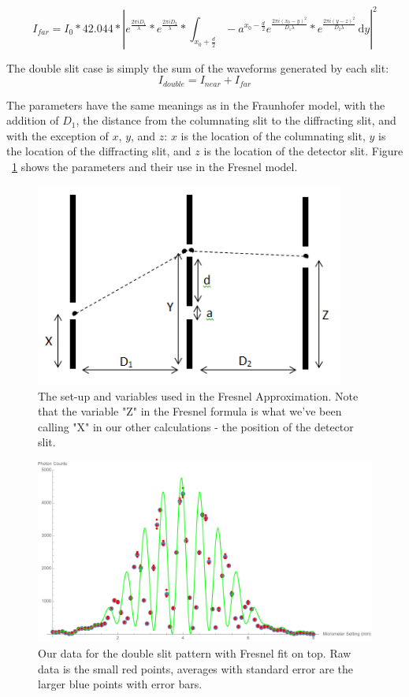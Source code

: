 \documentclass[prb,preprint]{revtex4-1}
\begin{document}
\begin{equation}
I_{far}=I_{0}*42.044*|e^{\frac{2 \pi i D_{1}}{\lambda}}*e^{\frac{2 \pi i D_{2}}{\lambda}}*\int_{x_{0}+\frac{d}{2}}-a^{x_{0}-\frac{d}{2}} \! e^{\frac{2 \pi i (x_{0}-y)^{2}}{D_{1} \lambda}}*e^{\frac{2 \pi i (y-z)^{2}}{D_{2} \lambda}} \, \mathrm{d}y |^{2}
\end{equation}

The double slit case is simply the sum of the waveforms generated by each slit: 
\begin{equation}
I_{double}=I_{near}+I_{far}
\end{equation}

The parameters have the same meanings as in the Fraunhofer model, with the addition of $D_1$, the distance from the columnating slit to the diffracting slit, and with the exception of $x$, $y$, and $z$: $x$ is the location of the columnating slit, $y$ is the location of the diffracting slit, and $z$ is the location of the detector slit.  Figure ~\ref{Fresnel_diagram} shows the parameters and their use in the Fresnel model.  

\begin{figure}[h!]
\centering
\includegraphics[width=4in]{Fresnel_diagram.png}
\caption{The set-up and variables used in the Fresnel Approximation. Note that the variable "Z" in the Fresnel formula is what we've been calling "X" in our other calculations - the position of the detector slit.}
\label{Fresnel_diagram}
\end{figure}

\begin{figure}[h!]
\centering
\includegraphics[width=6in]{double_slit_Fresnel_plot.pdf}
\caption{Our data for the double slit pattern with Fresnel fit on top.  Raw data is the small red points, averages with standard error are the larger blue points with error bars. }
\label{double_slit_Fresnel_plot}
\end{figure}
\end{document}
